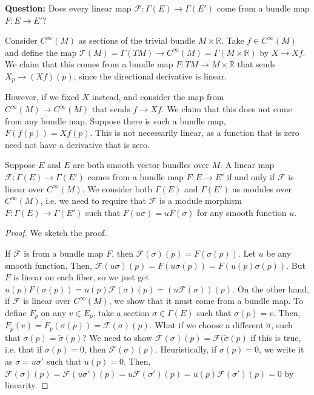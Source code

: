 \documentclass{../mathnotes}
\begin{document}
\textbf{Question:} Does every linear map $\mathcal{F}:\Gamma(E)\to \Gamma(E')$ come from a bundle map $F:E\to E'$? 

\begin{exmp}
    Consider $C^\infty(M)$ as sections of the trivial bundle $M\times \mathbb{R}$. Take $f\in C^\infty(M)$ and define the map
    $\mathcal{T}(M)=\Gamma(TM)\to C^\infty(M)=\Gamma(M\times \mathbb{R})$ by $X\to Xf$. We claim that this comes from a bundle map
    $F:TM\to M\times \mathbb{R}$ that sends $X_p\to (Xf)(p)$, since the directional derivative is linear.

    However, if we fixed $X$ instead, and consider the map from $C^\infty(M)\to C^\infty(M)$ that sends $f\to Xf$. We claim that this
    does not come from any bundle map. Suppose there is such a bundle map,  $F(f(p))=Xf(p)$. This is not necessarily linear, as a function
    that is zero need not have a derivative that is zero.
\end{exmp}

\begin{thm}
    Suppose $E$ and $E$ are both smooth vector bundles over $M$. A linear map $\mathcal{F}:\Gamma(E)\to\Gamma(E')$ comes from a bundle map
    $F:E\to E'$ if and only if $\mathcal{F}$ is linear over $C^\infty(M)$. We consider both $\Gamma(E)$ and $\Gamma(E')$ as modules over $C^\infty(M)$,
    i.e. we need to require that $\mathcal{F}$ is a module morphism $F:\Gamma(E)\to\Gamma(E')$ such that $F(u\sigma)=uF(\sigma)$ for any
    smooth function $u$.
\end{thm}
\begin{proof}
    We sketch the proof.

    If $\mathcal{F}$ is from a bundle map $F$, then $\mathcal{F}(\sigma)(p)=F(\sigma(p))$. Let $u$ be any smooth function.
    Then, $\mathcal{F}(u\sigma)(p)=F(u\sigma(p))=F(u(p)\sigma(p))$. But $F$ is linear on each fiber, so we just get $u(p)F(\sigma(p))=u(p)\mathcal{F}(\sigma)(p)=(u\mathcal{F}(\sigma))(p)$.
    On the other hand, if $\mathcal{F}$ is linear over $C^\infty(M)$, we show that it must come from a bundle map. To define $F_p$ on any
    $v\in E_p$, take a section $\sigma\in\Gamma(E)$ such that $\sigma(p)=v$. Then, $F_p(v)=F_p(\sigma(p))=\mathcal{F}(\sigma)(p)$.
    What if we choose a different $\tilde{\sigma}$, such that $\sigma(p)=\tilde{\sigma}(p)$? We need to show $\mathcal{F}(\sigma)(p)=\mathcal{F}(\tilde{\sigma}(p)$
    if this is true, i.e. that if $\sigma(p)=0$, then $\mathcal{F}(\sigma)(p)$. Heuristically, if $\sigma(p)=0$, we write it as $\sigma=u\sigma'$ such that $u(p)=0$.
    Then, $\mathcal{F}(\sigma)(p)=\mathcal{F}(u\sigma')(p)=u\mathcal{F}(\sigma')(p)=u(p)\mathcal{F}(\sigma')(p)=0$ by linearity.
\end{proof}
\end{document}
